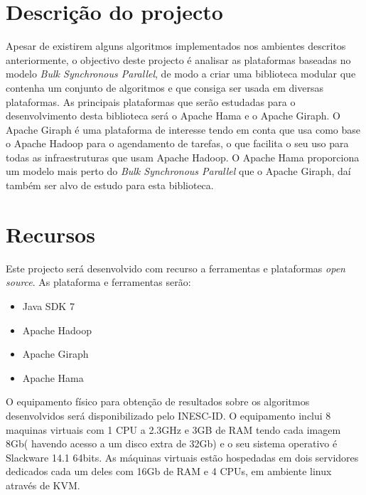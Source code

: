\section{Descrição do projecto}
Apesar de existirem alguns algoritmos implementados nos ambientes descritos anteriormente, o objectivo deste projecto é analisar as plataformas
baseadas no modelo \textit{Bulk Synchronous Parallel}, de modo a criar uma biblioteca modular que contenha um conjunto de algoritmos e que consiga
ser usada em diversas plataformas. As principais plataformas que serão estudadas para o desenvolvimento desta biblioteca será o Apache Hama e o Apache Giraph. 
O Apache Giraph é uma plataforma de interesse tendo em conta que usa como base o Apache Hadoop para o agendamento de tarefas, o que facilita o seu uso
para todas as infraestruturas que usam Apache Hadoop. O Apache Hama proporciona um modelo mais perto do \textit{Bulk Synchronous Parallel} que o Apache Giraph, daí também ser
alvo de estudo para esta biblioteca.


\section{Recursos}
Este projecto será desenvolvido com recurso a ferramentas e plataformas \textit{open source}.
As plataforma e ferramentas serão:
\begin{itemize}
 \item Java SDK 7
 \item Apache Hadoop
 \item Apache Giraph
 \item Apache Hama
\end{itemize}

O equipamento físico para obtenção de resultados sobre os algoritmos desenvolvidos será disponibilizado pelo INESC-ID. 
O equipamento inclui 8 maquinas virtuais com 1 CPU a 2.3GHz e 3GB de RAM tendo cada imagem 8Gb( havendo acesso a um disco extra de 32Gb) e o seu sistema operativo é Slackware 14.1 64bits.
As máquinas virtuais estão hospedadas em dois servidores dedicados cada um deles com 16Gb de RAM e 4 CPUs, em ambiente linux através de KVM.
